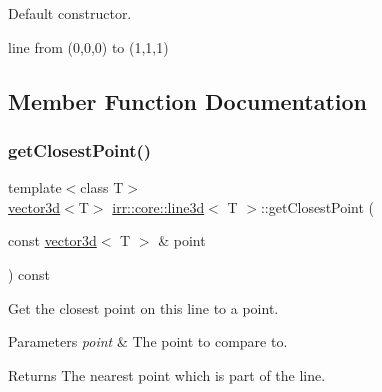 Default constructor. 

line from (0,0,0) to (1,1,1) 

\subsection{Member Function Documentation}
\mbox{\label{classirr_1_1core_1_1line3d_a40fefd94d9fe0d206eb46e6db52826dc}} 
\subsubsection{\texorpdfstring{get\+Closest\+Point()}{getClosestPoint()}}
{\footnotesize\ttfamily template$<$class T$>$ \\
\hyperlink{classirr_1_1core_1_1vector3d}{vector3d}$<$T$>$ \hyperlink{classirr_1_1core_1_1line3d}{irr\+::core\+::line3d}$<$ T $>$\+::get\+Closest\+Point (\begin{DoxyParamCaption}\item[{const \hyperlink{classirr_1_1core_1_1vector3d}{vector3d}$<$ T $>$ \&}]{point }\end{DoxyParamCaption}) const\hspace{0.3cm}{\ttfamily [inline]}}



Get the closest point on this line to a point. 


\begin{DoxyParams}{Parameters}
{\em point} & The point to compare to. \\
\hline
\end{DoxyParams}
\begin{DoxyReturn}{Returns}
The nearest point which is part of the line. 
\end{DoxyReturn}
\mbox{\label{classirr_1_1core_1_1line3d_a1315915ed1b1fb8a11eb8b561be193a0}} 
